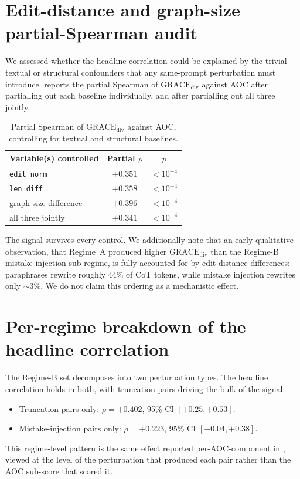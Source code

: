 \documentclass{article}
\newcommand{\gdiv}{\mathrm{GRACE}_{\text{div}}}
\begin{document}
\section{Edit-distance and graph-size partial-Spearman audit}
\label{app:partial}

We assessed whether the headline correlation could be explained by the
trivial textual or structural confounders that any same-prompt
perturbation must introduce.  reports the partial
Spearman of $\gdiv$ against AOC after partialling out each baseline
individually, and after partialling out all three jointly.

\begin{table}[h]
\centering\small
\caption{Partial Spearman of $\gdiv$ against AOC, controlling for
         textual and structural baselines.}
\label{tab:partial}
\begin{tabular}{lcc}
\toprule
Variable(s) controlled & Partial $\rho$ & $p$ \\
\midrule
\texttt{edit\_norm}             & ${+}0.351$ & ${<}10^{-4}$ \\
\texttt{len\_diff}              & ${+}0.358$ & ${<}10^{-4}$ \\
graph-size difference           & ${+}0.396$ & ${<}10^{-4}$ \\
all three jointly               & ${+}0.341$ & ${<}10^{-4}$ \\
\bottomrule
\end{tabular}
\end{table}

The signal survives every control. We additionally note that an early
qualitative observation, that Regime~A produced higher $\gdiv$ than
the Regime-B mistake-injection sub-regime, is fully accounted for by
edit-distance differences: paraphrases rewrite roughly $44\%$ of CoT
tokens, while mistake injection rewrites only $\sim 3\%$. We do not
claim this ordering as a mechanistic effect.

\section{Per-regime breakdown of the headline correlation}
\label{app:regime}

The Regime-B set decomposes into two perturbation types. The headline
correlation holds in both, with truncation pairs driving the bulk of
the signal:
\begin{itemize}
  \setlength{\itemsep}{2pt}\setlength{\topsep}{2pt}
  \item Truncation pairs only: $\rho = {+}0.402$, 95\% CI
        $[+0.25, +0.53]$.
  \item Mistake-injection pairs only: $\rho = {+}0.223$, 95\% CI
        $[+0.04, +0.38]$.
\end{itemize}
This regime-level pattern is the same effect reported per-AOC-component
in , viewed at the level of the perturbation
that produced each pair rather than the AOC sub-score that scored it.
\end{document}
